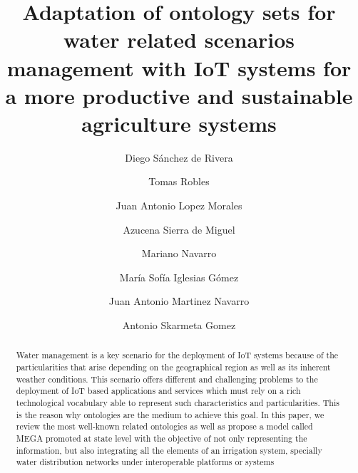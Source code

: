 \documentclass[runningheads,a4paper]{llncs}
\begin{document}
\mainmatter

\title{Adaptation of ontology sets for water related scenarios management with IoT systems for a more productive and sustainable agriculture systems}
\author{Diego Sánchez de Rivera \and
Tomas Robles \and
Juan Antonio Lopez Morales \and
Azucena Sierra de Miguel \and
Mariano Navarro \and
María Sofía Iglesias Gómez \and
Juan Antonio Martinez Navarro \and
Antonio Skarmeta Gomez}
\maketitle

\begin{abstract}
Water management is a key scenario for the deployment of IoT systems because of the particularities that arise depending on the geographical region as well as its inherent weather conditions. This scenario offers different and challenging problems to the deployment of IoT based applications and services which must rely on a rich technological vocabulary able to represent such characteristics and particularities. This is the reason why ontologies are the medium to achieve this goal. In this paper, we review the most well-known related ontologies as well as propose a model called MEGA promoted at state level with the objective of not only representing the information, but also integrating all the elements of an irrigation system, specially water distribution networks under interoperable platforms or systems

\end{abstract}
\end{document}
